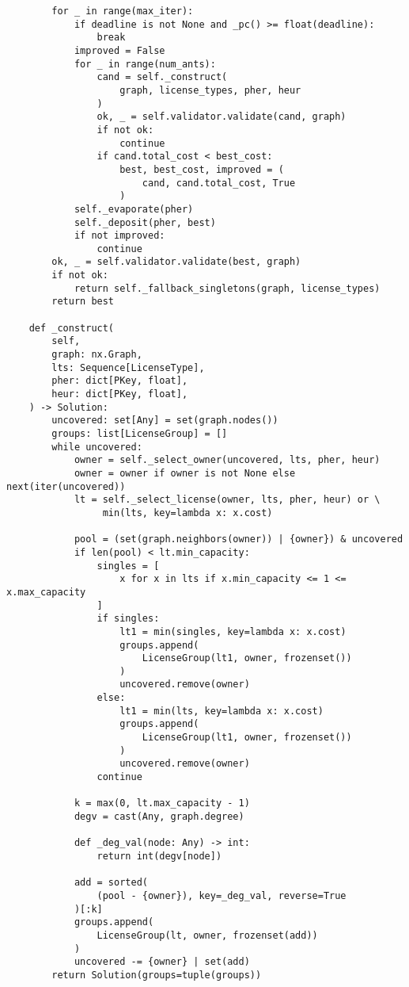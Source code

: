 {\begin{verbatim}
        for _ in range(max_iter):
            if deadline is not None and _pc() >= float(deadline):
                break
            improved = False
            for _ in range(num_ants):
                cand = self._construct(
                    graph, license_types, pher, heur
                )
                ok, _ = self.validator.validate(cand, graph)
                if not ok:
                    continue
                if cand.total_cost < best_cost:
                    best, best_cost, improved = (
                        cand, cand.total_cost, True
                    )
            self._evaporate(pher)
            self._deposit(pher, best)
            if not improved:
                continue
        ok, _ = self.validator.validate(best, graph)
        if not ok:
            return self._fallback_singletons(graph, license_types)
        return best

    def _construct(
        self,
        graph: nx.Graph,
        lts: Sequence[LicenseType],
        pher: dict[PKey, float],
        heur: dict[PKey, float],
    ) -> Solution:
        uncovered: set[Any] = set(graph.nodes())
        groups: list[LicenseGroup] = []
        while uncovered:
            owner = self._select_owner(uncovered, lts, pher, heur)
            owner = owner if owner is not None else next(iter(uncovered))
            lt = self._select_license(owner, lts, pher, heur) or \
                 min(lts, key=lambda x: x.cost)

            pool = (set(graph.neighbors(owner)) | {owner}) & uncovered
            if len(pool) < lt.min_capacity:
                singles = [
                    x for x in lts if x.min_capacity <= 1 <= x.max_capacity
                ]
                if singles:
                    lt1 = min(singles, key=lambda x: x.cost)
                    groups.append(
                        LicenseGroup(lt1, owner, frozenset())
                    )
                    uncovered.remove(owner)
                else:
                    lt1 = min(lts, key=lambda x: x.cost)
                    groups.append(
                        LicenseGroup(lt1, owner, frozenset())
                    )
                    uncovered.remove(owner)
                continue

            k = max(0, lt.max_capacity - 1)
            degv = cast(Any, graph.degree)

            def _deg_val(node: Any) -> int:
                return int(degv[node])

            add = sorted(
                (pool - {owner}), key=_deg_val, reverse=True
            )[:k]
            groups.append(
                LicenseGroup(lt, owner, frozenset(add))
            )
            uncovered -= {owner} | set(add)
        return Solution(groups=tuple(groups))


\end{verbatim}}
